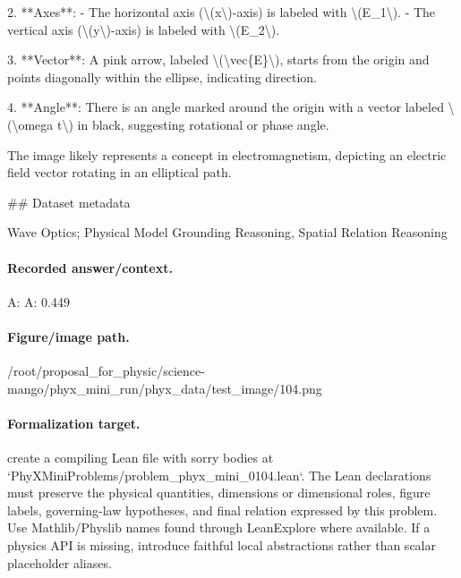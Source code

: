 2. **Axes**: 
   - The horizontal axis (\textbackslash{}(x\textbackslash{})-axis) is labeled with \textbackslash{}(E\_1\textbackslash{}).
   - The vertical axis (\textbackslash{}(y\textbackslash{})-axis) is labeled with \textbackslash{}(E\_2\textbackslash{}).

3. **Vector**: A pink arrow, labeled \textbackslash{}(\textbackslash{}vec\{E\}\textbackslash{}), starts from the origin and points diagonally within the ellipse, indicating direction.

4. **Angle**: There is an angle marked around the origin with a vector labeled \textbackslash{}(\textbackslash{}omega t\textbackslash{}) in black, suggesting rotational or phase angle.

The image likely represents a concept in electromagnetism, depicting an electric field vector rotating in an elliptical path.

\#\# Dataset metadata

Wave Optics; Physical Model Grounding Reasoning, Spatial Relation Reasoning

\paragraph{Recorded answer/context.}
A: A: 0.449

\paragraph{Figure/image path.}
/root/proposal\_for\_physic/science-mango/phyx\_mini\_run/phyx\_data/test\_image/104.png

\paragraph{Formalization target.}
create a compiling Lean file with sorry bodies at `PhyXMiniProblems/problem\_phyx\_mini\_0104.lean`. The Lean declarations must preserve the physical quantities, dimensions or dimensional roles, figure labels, governing-law hypotheses, and final relation expressed by this problem.
Use Mathlib/Physlib names found through LeanExplore where available. If a physics API is missing, introduce faithful local abstractions rather than scalar placeholder aliases.

